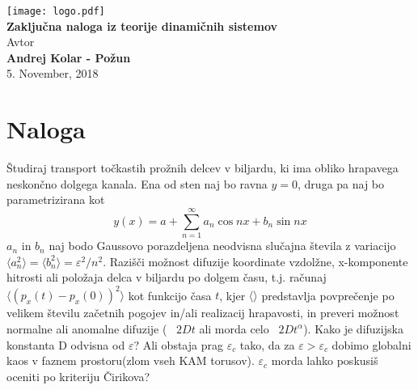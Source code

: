 \documentclass{article}
\begin{document}
\begin{titlepage}
    \begin{center}
        \vspace*{1cm}
        \Large
\texttt{[image: logo.pdf]}\\
        \Large
\vspace{1cm}
        \huge
        \textbf{Zaključna naloga iz teorije dinamičnih sistemov\\}
\Large  
        \vspace{1cm}
 	Avtor\\
        \textbf{Andrej Kolar - Po{\v z}un\\}
        \vspace{0.8cm}
 5. November, 2018

\vfill
\normalsize
    \end{center}
\end{titlepage}

\newpage
\tableofcontents
\newpage
{}
{}
\section{Naloga}

Študiraj transport točkastih prožnih delcev v biljardu, ki ima obliko hrapavega neskončno dolgega kanala. Ena od sten naj bo ravna $y=0$, druga pa naj bo parametrizirana kot
\begin{equation*}
y(x) = a + \sum_{n=1}^\infty a_n \cos nx + b_n \sin nx
\end{equation*}
$a_n$ in $b_n$ naj bodo Gaussovo porazdeljena neodvisna slučajna števila z variacijo $\langle a_n^2 \rangle = \langle b_n^2 \rangle = \varepsilon^2 / n^2$.
Razišči možnost difuzije koordinate vzdolžne, x-komponente hitrosti ali položaja delca v biljardu po dolgem času, t.j. računaj $\langle (p_x(t) - p_x(0))^2 \rangle$ kot funkcijo časa $t$, kjer $\langle \rangle$ predstavlja povprečenje po velikem številu začetnih pogojev in/ali realizacij hrapavosti, in preveri možnost normalne ali anomalne difuzije (~ $2Dt$ ali morda celo ~$2Dt^\alpha$). Kako je difuzijska konstanta D odvisna od $\varepsilon$? Ali obstaja prag $\varepsilon_c$ tako, da za $\varepsilon > \varepsilon_c$ dobimo globalni kaos v faznem prostoru(zlom vseh KAM torusov). $\varepsilon_c$ morda lahko poskusiš oceniti po kriteriju Čirikova?
\end{document}
